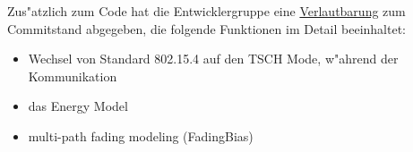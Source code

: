 Zus"atzlich zum Code hat die Entwicklergruppe eine
\href{http://mailman.isi.edu/pipermail/ns-developers/2015-January/012459.html}{Verlautbarung}
zum Commitstand abgegeben, die folgende Funktionen im Detail beeinhaltet:

\begin{itemize}
  \item Wechsel von Standard 802.15.4 auf den TSCH Mode, w"ahrend der Kommunikation
  \item das Energy Model
  \item multi-path fading modeling (FadingBias)
\end{itemize}
